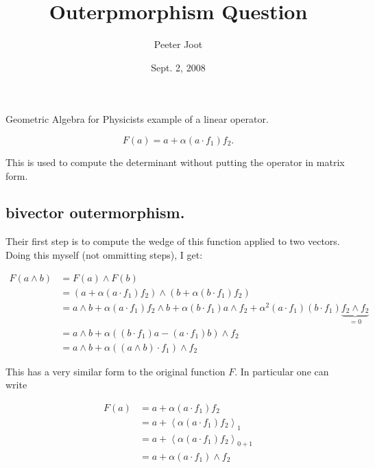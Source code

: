 \documentclass{article}
\title{ Outerpmorphism Question }
\author{Peeter Joot}
\date{ Sept. 2, 2008}
\newcommand{\gpgrade}[2] {{\left\langle{{#1}}\right\rangle}_{#2}}
\newcommand{\gpgradeone}[1] {\gpgrade{#1}{1}}
\begin{document}
\maketitle{}

\section{}

Geometric Algebra for Physicists example of a linear operator.

\begin{equation}\label{eqn:F}
F(a) = a + \alpha(a \cdot f_1) f_2. 
\end{equation} 

This is used to compute the determinant without putting the operator 
in matrix form.

\subsection{ bivector outermorphism. }

Their first step is to compute the wedge of this function applied to two vectors.  Doing this myself (not ommitting steps), I get:

\begin{align*} 
F(a \wedge b) 
&= F(a) \wedge F(b) \\
&= (a + \alpha(a \cdot f_1) f_2 ) \wedge (b + \alpha(b \cdot f_1) f_2 ) \\
&= a \wedge b + \alpha(a \cdot f_1) f_2 \wedge b
+ \alpha (b \cdot f_1) a \wedge f_2 
+ \alpha^2 (a \cdot f_1) (b \cdot f_1) \underbrace{f_2 \wedge f_2}_{=0} \\
&= a \wedge b 
+ \alpha \left( (b \cdot f_1) a - (a \cdot f_1) b \right) \wedge f_2  
\\
&= a \wedge b 
+ \alpha \left( (a \wedge b ) \cdot f_1 \right) \wedge f_2  
\end{align*} 

This has a very similar form to the original function $F$.  In particular 
one can write 

\begin{align*}
F(a) 
&= a + \alpha(a \cdot f_1) f_2 \\
&= a + \gpgradeone{\alpha(a \cdot f_1) f_2} \\
&= a + \gpgrade{\alpha(a \cdot f_1) f_2}{0+1} \\
&= a + \alpha(a \cdot f_1) \wedge f_2 \\
\end{align*}
\end{document}

